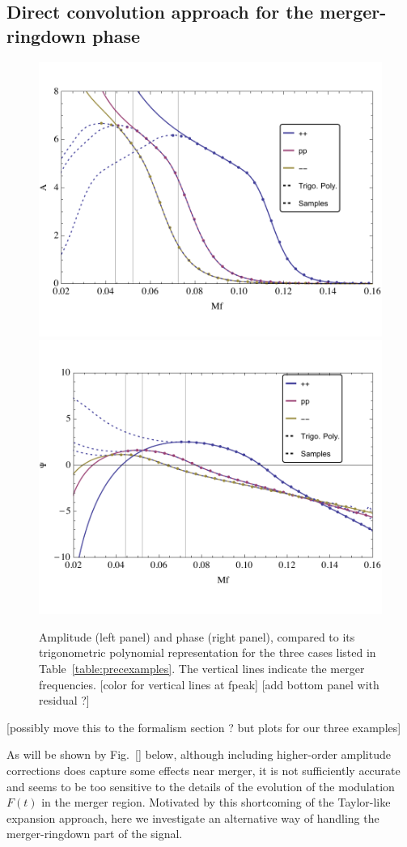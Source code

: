 \documentclass[aps,showpacs,twocolumn,
prd,superscriptaddress,nofootinbib]{revtex4-1}
\newcommand{\SM}[1]{{\color{Red} #1}}
\begin{document}

\subsection{Direct convolution approach for the merger-ringdown phase}
\label{subsec:trigopoly}

\begin{figure}
  \centering
  \includegraphics[width=.48\linewidth]{plots/trig_amp.pdf}
  \hspace{0.2cm}
  \includegraphics[width=.48\linewidth]{plots/trig_phase.pdf}
  \caption{Amplitude (left panel) and phase (right panel), compared to its trigonometric polynomial representation for the three cases listed in Table~\ref{table:precexamples}. The vertical lines indicate the merger frequencies. \SM{[color for vertical lines at fpeak]} \SM{[add bottom panel with residual ?]}}
  \label{fig:trigopoly}
\end{figure}

\SM{[possibly move this to the formalism section ? but plots for our three examples]}

As will be shown by Fig.~\ref{} below, although including higher-order amplitude corrections does capture some effects near merger, it is not sufficiently accurate and seems to be too sensitive to the details of the evolution of the modulation $F(t)$ in the merger region. Motivated by this shortcoming of the Taylor-like expansion approach, here we investigate an alternative way of handling the merger-ringdown part of the signal.
\end{document}
